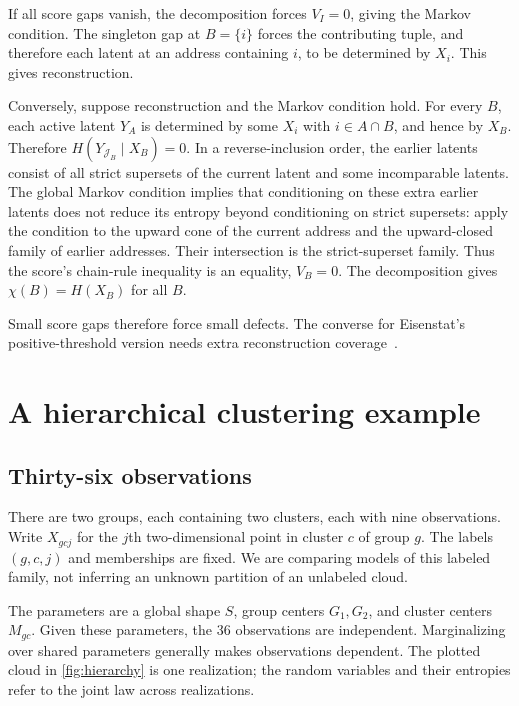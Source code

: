 \documentclass[11pt]{article}
\begin{document}
\begin{solution}[ex:scores]
\begin{enumerate}
If all score gaps vanish, the decomposition forces $V_I=0$, giving the Markov
condition. The singleton gap at $B=\{i\}$ forces the contributing tuple,
and therefore each latent at an address containing $i$, to be determined by
$X_i$. This gives reconstruction.

Conversely, suppose reconstruction and the Markov condition hold.
For every $B$, each active latent $Y_A$ is determined by some $X_i$ with
$i\in A\cap B$, and hence by $X_B$. Therefore
$H(Y_{\mathcal{J}_B}\mid X_B)=0$.
In a reverse-inclusion order, the earlier latents consist of all strict
supersets of the current latent and some incomparable latents. The global
Markov condition implies that conditioning on these extra earlier latents does
not reduce its entropy beyond conditioning on strict supersets: apply the
condition to the upward cone of the current address and the upward-closed
family of earlier addresses. Their intersection is the strict-superset
family. Thus the score's chain-rule inequality is an equality, $V_B=0$.
The decomposition gives $\chi(B)=H(X_B)$ for all $B$.
\end{enumerate}
\end{solution}

Small score gaps therefore force small defects. The converse for Eisenstat's
positive-threshold version needs extra reconstruction
coverage~\citep{benson2026relating}.

\section{A hierarchical clustering example}
\label{sec:clustering}
\subsection{Thirty-six observations}
There are two groups, each containing two clusters, each with nine observations.
Write $X_{gcj}$ for the $j$th two-dimensional point in cluster $c$ of group $g$.
The labels $(g,c,j)$ and memberships are fixed. We are comparing models of this
labeled family, not inferring an unknown partition of an unlabeled cloud.

The parameters are a global shape $S$, group centers $G_1,G_2$, and cluster
centers $M_{gc}$. Given these parameters, the 36 observations are independent.
Marginalizing over shared parameters generally makes observations dependent.
The plotted cloud in \cref{fig:hierarchy} is one realization; the random variables and their entropies
refer to the joint law across realizations.
\end{document}
